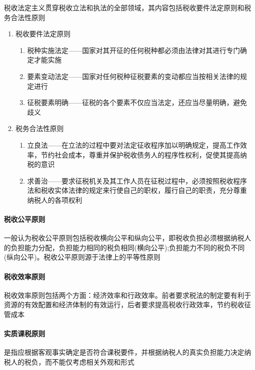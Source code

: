 \documentclass[UTF8,12pt]{ctexart}
\numberwithin{equation}{section} %
\numberwithin{figure}{section}
\numberwithin{table}{section}
\begin{document}
	税收法定主义贯穿税收立法和执法的全部领域，其内容包括税收要件法定原则和税务合法性原则
	\begin{enumerate}
		\item 税收要件法定原则
		\begin{enumerate}
			\item 税种实施法定——国家对其开征的任何税种都必须由法律对其进行专门确定才能实施
			
			\item 要素变动法定——国家对任何税种征税要素的变动都应当按相关法律的规定进行
			
			\item 征税要素明确——征税的各个要素不仅应当法定，还应当尽量明确，避免歧义
		\end{enumerate}
		
		\item 税务合法性原则
		\begin{enumerate}
			\item 立良法——在立法的过程中要对法定征收程序加以明确规定，提高工作效率，节约社会成本，尊重并保护税收债务人的程序性权利，促使其提高纳税的意识
			
			\item 求善治——要求征税机关及其工作人员在征税过程中，必须按照税收程序法和税收实体法律的规定来行使自己的职权，履行自己的职责，充分尊重纳税人的各项权利
		\end{enumerate}
	\end{enumerate}
	
	
	\paragraph{税收公平原则}
	一般认为税收公平原则包括税收横向公平和纵向公平，即税收负担必须根据纳税人的负担能力分配，负担能力相同的税负相同(横向公平);负担能力不同的税负不同(纵向公平)。税收公平原则源于法律上的平等性原则
	
	\paragraph{税收效率原则}
	税收效率原则包括两个方面：经济效率和行政效率。前者要求税法的制定要有利于资源的有效配置和经济体制的有效运行，后者要求提高税收行政效率，节约税收征管成本
	
	\paragraph{实质课税原则}
	是指应根据客观事实确定是否符合课税要件，并根据纳税人的真实负担能力决定纳税人的税负，而不能仅考虑相关外观和形式
	
\end{document}
